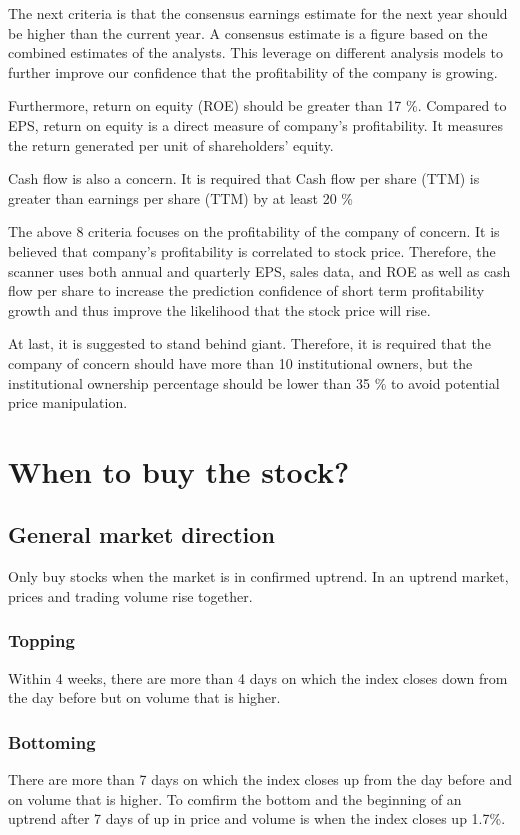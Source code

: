 \documentclass{article}
\begin{document}
The next criteria is that the consensus earnings estimate for the next year should be higher than the current year. A consensus estimate is a figure based on the combined estimates of the analysts. This leverage on different analysis models to further improve our confidence that the profitability of the company is growing.

Furthermore, return on equity (ROE) should be greater than 17 \%. Compared to EPS, return on equity is a direct measure of company's profitability. It measures the return generated per unit of shareholders' equity.

Cash flow is also a concern. It is required that Cash flow per share (TTM) is greater than earnings per share (TTM) by at least 20 \%

The above 8 criteria focuses on the profitability of the company of concern. It is believed that company's profitability is correlated to stock price. Therefore, the scanner uses both annual and quarterly EPS, sales data, and ROE as well as cash flow per share to increase the prediction confidence of short term profitability growth and thus improve the likelihood that the stock price will rise.

At last, it is suggested to stand behind giant. Therefore, it is required that the company of concern should have more than 10 institutional owners, but the institutional ownership percentage should be lower than 35 \% to avoid potential price manipulation.

\section{When to buy the stock?}
\label{Whentobuythestock}
\subsection{General market direction}
Only buy stocks when the market is in confirmed uptrend. In an uptrend market, prices and trading volume rise together.

\subsubsection{Topping}
Within 4 weeks, there are more than 4 days on which the index closes down from the day before but on volume that is higher.

\subsubsection{Bottoming}
There are more than 7 days on which the index closes up from the day before and on volume that is higher. To comfirm the bottom and the beginning of an uptrend after 7 days of up in price and volume is when the index closes up 1.7\%.
\end{document}
